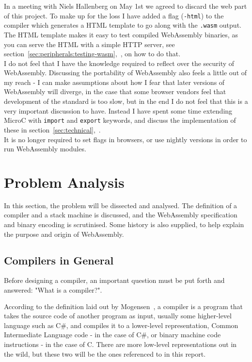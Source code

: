 \documentclass[a4paper]{article}
\begin{document}
In a meeting with Niels Hallenberg on May 1st we agreed to discard the web part of this project. To make up for the loss I have added a flag (\texttt{-html}) to the compiler which generates a HTML template to go along with the \texttt{.wasm} output. The HTML template makes it easy to test compiled WebAssembly binaries, as you can serve the HTML with a simple HTTP server, see section~\ref{sec:peripherals:testing-wasm},~, on how to do that.\\

\noindent I do not feel that I have the knowledge required to reflect over the security of WebAssembly. Discussing the portability of WebAssembly also feels a little out of my reach - I can make assumptions about how I fear that later versions of WebAssembly will diverge, in the case that some browser vendors feel that development of the standard is too slow, but in the end I do not feel that this is a very important discussion to have. Instead I have spent some time extending MicroC with \texttt{import} and \texttt{export} keywords, and discuss the implementation of these in section~\ref{sec:technical},~.\\

\noindent It is no longer required to set flags in browsers, or use nightly versions in order to run WebAssembly modules.

\newpage
\section{Problem Analysis}
\label{sec:problem-analysis}
In this section, the problem will be dissected and analysed. The definition of a compiler and a stack machine is discussed, and the WebAssembly specification and binary encoding is scrutinised. Some history is also supplied, to help explain the purpose and origin of WebAssembly.

\subsection{Compilers in General}
\label{sec:problem-analysis:compilers}
Before designing a compiler, an important question must be put forth and answered: "What is a compiler?".

According to the definition laid out by Mogensen~\cite{BCD}, a compiler is a program that takes the source code of another program as input, usually some higher-level language such as C\#, and compiles it to a lower-level representation, Common Intermediate Language code - in the case of C\#, or binary machine code instructions - in the case of C. There are more low-level representations out in the wild, but these two will be the ones referenced to in this report.
\end{document}
